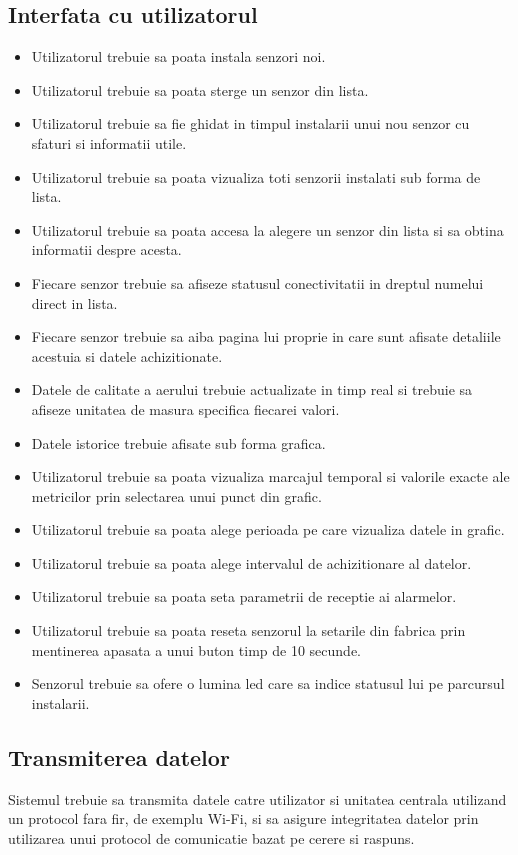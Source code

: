 \subsection{Interfata cu utilizatorul}\label{subsec:cf_interfata}
\begin{itemize}
    \item Utilizatorul trebuie sa poata instala senzori noi.
    \item Utilizatorul trebuie sa poata sterge un senzor din lista.
    \item Utilizatorul trebuie sa fie ghidat in timpul instalarii unui nou senzor cu sfaturi si informatii utile.
    \item Utilizatorul trebuie sa poata vizualiza toti senzorii instalati sub forma de lista.
    \item Utilizatorul trebuie sa poata accesa la alegere un senzor din lista si sa obtina informatii despre acesta.
    \item Fiecare senzor trebuie sa afiseze statusul conectivitatii in dreptul numelui direct in lista.
    \item Fiecare senzor trebuie sa aiba pagina lui proprie in care sunt afisate detaliile acestuia si datele achizitionate.
    \item Datele de calitate a aerului trebuie actualizate in timp real si trebuie sa afiseze unitatea de masura specifica fiecarei valori.
    \item Datele istorice trebuie afisate sub forma grafica.
    \item Utilizatorul trebuie sa poata vizualiza marcajul temporal si valorile exacte ale metricilor prin selectarea unui punct din grafic.
    \item Utilizatorul trebuie sa poata alege perioada pe care vizualiza datele in grafic.
    \item Utilizatorul trebuie sa poata alege intervalul de achizitionare al datelor.
    \item Utilizatorul trebuie sa poata seta parametrii de receptie ai alarmelor.
    \item Utilizatorul trebuie sa poata reseta senzorul la setarile din fabrica prin mentinerea apasata a unui buton timp de 10 secunde.
    \item Senzorul trebuie sa ofere o lumina led care sa indice statusul lui pe parcursul instalarii.
\end{itemize}

\subsection{Transmiterea datelor}\label{subsec:cf_transmitere}
Sistemul trebuie sa transmita datele catre utilizator si unitatea centrala utilizand un protocol fara fir, de exemplu Wi-Fi, si sa asigure integritatea 
datelor prin utilizarea unui protocol de comunicatie bazat pe cerere si raspuns.
 
